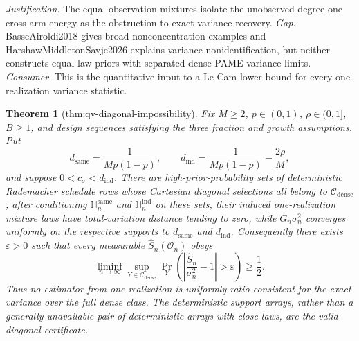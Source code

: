 \documentclass{article}
\newtheorem{theorem}{Theorem}
\begin{document}
\par\smallskip\noindent \textit{Justification.} The equal observation mixtures isolate the unobserved degree-one cross-arm energy as the obstruction to exact variance recovery. \textit{Gap.} BasseAiroldi2018 gives broad nonconcentration examples and HarshawMiddletonSavje2026 explains variance nonidentification, but neither constructs equal-law priors with separated dense PAME variance limits. \textit{Consumer.} This is the quantitative input to a Le Cam lower bound for every one-realization variance statistic.

\begin{theorem}[thm:qv-diagonal-impossibility]\label{thm:qv-diagonal-impossibility}
Fix \(M\ge2\), \(p\in(0,1)\), \(\rho\in(0,1]\), \(B\ge1\), and design sequences satisfying the three fraction and growth assumptions.  Put
\[
 d_{\mathrm{same}}=\frac1{Mp(1-p)},\qquad
 d_{\mathrm{ind}}=\frac1{Mp(1-p)}-\frac{2\rho}{M},
\]
and suppose \(0<c_\sigma<d_{\mathrm{ind}}\).  There are high-prior-probability sets of deterministic Rademacher schedule rows whose Cartesian diagonal selections all belong to \(\mathcal C_{\mathrm{dense}}\); after conditioning \(\mathbb H_n^{\mathrm{same}}\) and \(\mathbb H_n^{\mathrm{ind}}\) on these sets, their induced one-realization mixture laws have total-variation distance tending to zero, while \(G_n\sigma_n^2\) converges uniformly on the respective supports to \(d_{\mathrm{same}}\) and \(d_{\mathrm{ind}}\).  Consequently there exists \(\varepsilon>0\) such that every measurable \(\widehat S_n(\mathcal O_n)\) obeys
\[
 \liminf_{n\to\infty}\sup_{Y\in\mathcal C_{\mathrm{dense}}}
 \Pr_Y\left(\left|\frac{\widehat S_n}{\sigma_n^2}-1\right|>\varepsilon\right)
 \ge\frac12.
\]
Thus no estimator from one realization is uniformly ratio-consistent for the exact variance over the full dense class.  The deterministic support arrays, rather than a generally unavailable pair of deterministic arrays with close laws, are the valid diagonal certificate.
\end{theorem}
\end{document}
